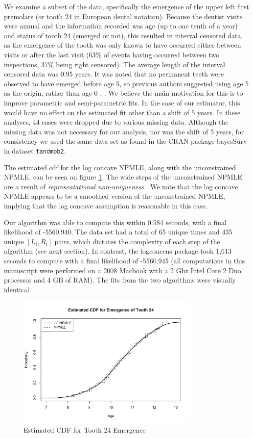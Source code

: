 	We examine a subset of the data, specifically the emergence of the upper left first premolars (or tooth 24 in European dental notation). Because the dentist visits were annual and the information recorded was age (up to one tenth of a year) and status of tooth 24 (emerged or not), this resulted in interval censored data, as the emergence of the tooth was only known to have occurred either between visits or after the last visit (63\% of events having occurred between two inspections, 37\% being right censored). The average length of the interval censored data was 0.95 years. It was noted that no permanent teeth were observed to have emerged before age 5, so previous authors suggested using age 5 as the origin, rather than age 0 \cite{RefGCOL2009}, \cite{RefKL2009}. We believe the main motivation for this is to improve parametric and semi-parametric fits. In the case of our estimator, this would have no effect on the estimated fit other than a shift of 5 years. In these analyses, 44 cases were dropped due to various missing data. Although the missing data was not necessary for our analysis, nor was the shift of 5 years, for consistency we used the same data set as found in the CRAN package bayesSurv \cite{R_BayesSurv} in dataset \texttt{tandmob2}. 

	The estimated cdf for the log concave NPMLE, along with the unconstrained NPMLE, can be seen on figure \ref{figure:teeth}. The wide steps of the unconstrained NPMLE are a result of \emph{representational non-uniqueness} \cite{RefGV2002}. We note that the log concave NPMLE appears to be a smoothed version of the unconstrained NPMLE, implying that the log concave assumption is reasonable in this case. 
	
	Our algorithm was able to compute this within 0.584 seconds, with a final likelihood of -5560.940. The data set had a total of 65 unique times and 435 unique $[L_i, R_i]$ pairs, which dictates the complexity of each step of the algorithm (see next section). In contrast, the logconcens package took 1,613 seconds to compute with a final likelihood of -5560.945 (all computations in this manuscript were performed on a 2008 Macbook with a 2 Ghz Intel Core 2 Duo processor and 4 GB of RAM). The fits from the two algorithms were visually identical. 
\\
\begin{figure}[h]
\centerline{\includegraphics[width = 9cm]{ToothEmergence.pdf}}
\caption{Estimated CDF for Tooth 24 Emergence}
\label{figure:teeth}
\end{figure}		



